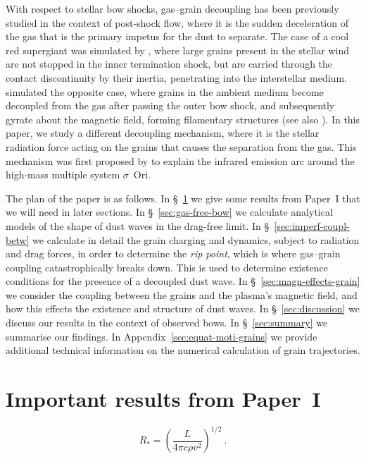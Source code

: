 \documentclass[useAMS, usenatbib, a4paper]{mnras}
\begin{document}
With respect to stellar bow shocks, gas--grain decoupling has been
previously studied in the context of post-shock flow, where it is the
sudden deceleration of the gas that is the primary impetus for the
dust to separate.  The case of a cool red supergiant was simulated by
\citet{van-Marle:2011a}, where large grains present in the stellar
wind are not stopped in the inner termination shock, but are carried
through the contact discontinuity by their inertia, penetrating into
the interstellar medium.  \citet{Katushkina:2017a} simulated the
opposite case, where grains in the ambient medium become decoupled
from the gas after passing the outer bow shock, and subsequently
gyrate about the magnetic field, forming filamentary structures (see
also \citealp{Katushkina:2018a}).  In this paper, we study a different
decoupling mechanism, where it is the stellar radiation force acting
on the grains that causes the separation from the gas.  This mechanism
was first proposed by \citet{Ochsendorf:2014b} to explain the infrared
emission arc around the high-mass multiple system \(\sigma\)~Ori.

The plan of the paper is as follows.
%
In \S~\ref{sec:recap-paper-i} we give some results from Paper~I that
we will need in later sections.
%
In \S~\ref{sec:gas-free-bow} we calculate analytical models of the
shape of dust waves in the drag-free limit.
%
In \S~\ref{sec:imperf-coupl-betw} we calculate in detail the grain
charging and dynamics, subject to radiation and drag forces, in order
to determine the \textit{rip point}, which is where gas--grain coupling
catastrophically breaks down.  This is used to determine existence
conditions for the presence of a decoupled dust wave.
%
In \S~\ref{sec:magn-effects-grain} we consider the coupling between
the grains and the plasma's magnetic field, and how this effects the
existence and structure of dust waves.
%
In \S~\ref{sec:discussion} we discuss our results in the context of observed bows.
%
In \S~\ref{sec:summary} we summarise our findings.
%
In Appendix~\ref{sec:equat-moti-grains} we provide additional
technical information on the numerical calculation of grain
trajectories.

\section{Important results from Paper~I}
\label{sec:recap-paper-i}

\begin{equation}
  \label{eq:Rstar}
  R_* = \left(\frac{L}{4\pi c \rho v^2}\right)^{1/2} \ .
\end{equation}
\end{document}
